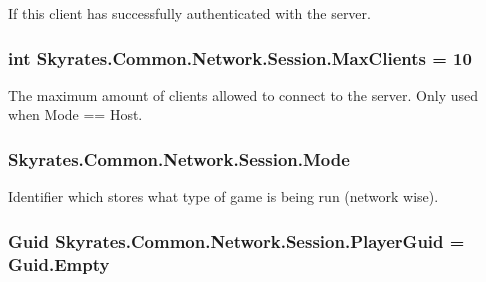 If this client has successfully authenticated with the server. 

\hypertarget{class_skyrates_1_1_common_1_1_network_1_1_session_a4d9934f0f98f603daf947afacf49d3fb}{
\subsubsection[{Max\-Clients}]{\setlength{\rightskip}{0pt plus 5cm}int Skyrates.\-Common.\-Network.\-Session.\-Max\-Clients = 10}}\label{class_skyrates_1_1_common_1_1_network_1_1_session_a4d9934f0f98f603daf947afacf49d3fb}


The maximum amount of clients allowed to connect to the server. Only used when Mode == Host. 

\hypertarget{class_skyrates_1_1_common_1_1_network_1_1_session_a659a2e1e5c0bc707eb0e6dcfa17b17a8}{
\subsubsection[{Mode}]{ Skyrates.\-Common.\-Network.\-Session.\-Mode}}\label{class_skyrates_1_1_common_1_1_network_1_1_session_a659a2e1e5c0bc707eb0e6dcfa17b17a8}


Identifier which stores what type of game is being run (network wise). 

\hypertarget{class_skyrates_1_1_common_1_1_network_1_1_session_a2c3090338ac56475b1a536db879e8ddf}{
\subsubsection[{Player\-Guid}]{\setlength{\rightskip}{0pt plus 5cm}Guid Skyrates.\-Common.\-Network.\-Session.\-Player\-Guid = Guid.\-Empty}}\label{class_skyrates_1_1_common_1_1_network_1_1_session_a2c3090338ac56475b1a536db879e8ddf}



